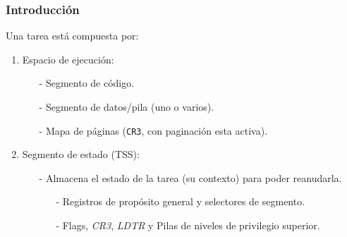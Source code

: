 \documentclass[aspectratio=169]{beamer}
\begin{document}
\begin{frame}
    \frametitle{Introducci\'on}
    \large Una tarea est\'a compuesta por:
    \vspace{0.4cm}
    \pause
    \begin{enumerate}
        \item Espacio de ejecuci\'on:
        \begin{itemize}
        \large
        \vspace{0.1cm}
        \item[-] Segmento de c\'odigo.
        \vspace{0.1cm}
        \item[-] Segmento de datos/pila (uno o varios).
        \vspace{0.1cm}
        \item[-] Mapa de páginas (\texttt{CR3}, con paginación esta activa).
        \end{itemize}
        \vspace{0.4cm}
        \pause
        \item Segmento de estado (TSS):
        \begin{itemize}
        \vspace{0.1cm}
        \large
        \item[-] Almacena el estado de la tarea (su contexto) para poder reanudarla.
        \begin{itemize}
        \large
        \vspace{0.05cm}
        \item[-] Registros de propósito general y selectores de segmento.
        \item[-] Flags, \emph{CR3}, \emph{LDTR} y Pilas de niveles de privilegio superior.
        \end{itemize}
        \end{itemize}
    \end{enumerate}
\end{frame}
\end{document}
